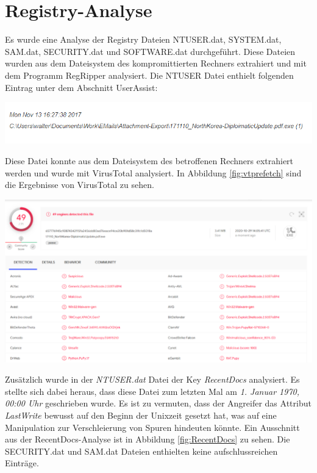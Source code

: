 \section{Registry-Analyse}
Es wurde eine Analyse der Registry Dateien NTUSER.dat, SYSTEM.dat, SAM.dat, SECURITY.dat und SOFTWARE.dat durchgeführt. Diese Dateien wurden aus dem Dateisystem des kompromittierten Rechners extrahiert und mit dem Programm RegRipper analysiert.
Die NTUSER Datei enthielt folgenden Eintrag unter dem Abschnitt UserAssist:
\\
\begin{center}
	\includegraphics[width=15.8cm]{figures/prefetch_path.png}
	\label{fig:prefetch_path}
\end{center}
\newpage
Diese Datei konnte aus dem Dateisystem des betroffenen Rechners extrahiert werden und wurde mit VirusTotal analysiert. In Abbildung \ref{fig:vtprefetch}  sind die Ergebnisse von VirusTotal zu sehen.

\begin{center}
	\includegraphics[width=15.8cm]{figures/virustotal_prefetch.png}
	\label{fig:vtprefetch}
\end{center}

Zusätzlich wurde in der \textit{NTUSER.dat} Datei der Key \textit{RecentDocs} analysiert. Es stellte sich dabei heraus, dass diese Datei zum letzten Mal am \textit{1. Januar 1970, 00:00 Uhr} geschrieben wurde.
Es ist zu vermuten, dass der Angreifer das Attribut \textit{LastWrite} bewusst auf den Beginn der Unixzeit gesetzt hat, was auf eine Manipulation zur Verschleierung von Spuren hindeuten könnte.
Ein Ausschnitt aus der RecentDocs-Analyse ist in Abbildung \ref{fig:RecentDocs} zu sehen.
Die SECURITY.dat und SAM.dat Dateien enthielten keine aufschlussreichen Einträge.

